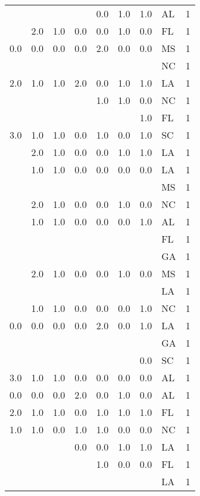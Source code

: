 \begin{tabular}{llllllllr}
    &     &     &     & 0.0 & 1.0 & 1.0 & AL &     1 \\
    & 2.0 & 1.0 & 0.0 & 0.0 & 1.0 & 0.0 & FL &     1 \\
0.0 & 0.0 & 0.0 & 0.0 & 2.0 & 0.0 & 0.0 & MS &     1 \\
    &     &     &     &     &     &     & NC &     1 \\
2.0 & 1.0 & 1.0 & 2.0 & 0.0 & 1.0 & 1.0 & LA &     1 \\
    &     &     &     & 1.0 & 1.0 & 0.0 & NC &     1 \\
    &     &     &     &     &     & 1.0 & FL &     1 \\
3.0 & 1.0 & 1.0 & 0.0 & 1.0 & 0.0 & 1.0 & SC &     1 \\
    & 2.0 & 1.0 & 0.0 & 0.0 & 1.0 & 1.0 & LA &     1 \\
    & 1.0 & 1.0 & 0.0 & 0.0 & 0.0 & 0.0 & LA &     1 \\
    &     &     &     &     &     &     & MS &     1 \\
    & 2.0 & 1.0 & 0.0 & 0.0 & 1.0 & 0.0 & NC &     1 \\
    & 1.0 & 1.0 & 0.0 & 0.0 & 0.0 & 1.0 & AL &     1 \\
    &     &     &     &     &     &     & FL &     1 \\
    &     &     &     &     &     &     & GA &     1 \\
    & 2.0 & 1.0 & 0.0 & 0.0 & 1.0 & 0.0 & MS &     1 \\
    &     &     &     &     &     &     & LA &     1 \\
    & 1.0 & 1.0 & 0.0 & 0.0 & 0.0 & 1.0 & NC &     1 \\
0.0 & 0.0 & 0.0 & 0.0 & 2.0 & 0.0 & 1.0 & LA &     1 \\
    &     &     &     &     &     &     & GA &     1 \\
    &     &     &     &     &     & 0.0 & SC &     1 \\
3.0 & 1.0 & 1.0 & 0.0 & 0.0 & 0.0 & 0.0 & AL &     1 \\
0.0 & 0.0 & 0.0 & 2.0 & 0.0 & 1.0 & 0.0 & AL &     1 \\
2.0 & 1.0 & 1.0 & 0.0 & 1.0 & 1.0 & 1.0 & FL &     1 \\
1.0 & 1.0 & 0.0 & 1.0 & 1.0 & 0.0 & 0.0 & NC &     1 \\
    &     &     & 0.0 & 0.0 & 1.0 & 1.0 & LA &     1 \\
    &     &     &     & 1.0 & 0.0 & 0.0 & FL &     1 \\
    &     &     &     &     &     &     & LA &     1 \\

\end{tabular}
